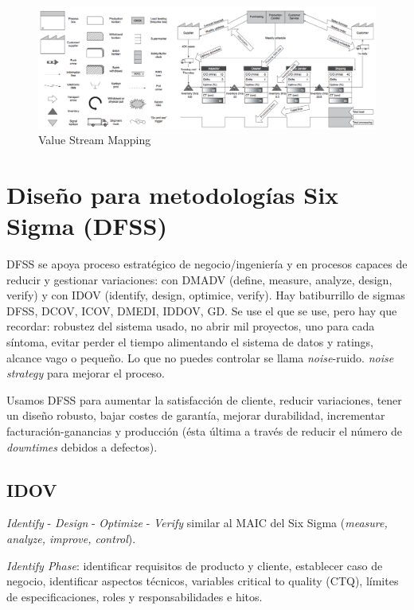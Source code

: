 \documentclass[]{article}
\begin{document}
\begin{figure}[ht!]
	\centering
	\includegraphics[width=170mm]{imagenes/ValueStreamMapping.png}
	\caption{Value Stream Mapping}
	\label{fig:ValueStreamMapping}
\end{figure}

\section{Diseño para metodologías Six Sigma (DFSS)}

DFSS se apoya proceso estratégico de negocio/ingeniería y en procesos capaces de reducir y gestionar variaciones: con DMADV (define, measure, analyze, design, verify) y con IDOV (identify, design, optimice, verify). Hay batiburrillo de sigmas DFSS, DCOV, ICOV, DMEDI, IDDOV, GD. Se use el que se use, pero hay que recordar: robustez del sistema usado, no abrir mil proyectos, uno para cada síntoma, evitar perder el tiempo alimentando el sistema de datos y ratings, alcance vago o pequeño. Lo que no puedes controlar se llama \textit{noise}-ruido. \textit{noise strategy} para mejorar el proceso.

Usamos DFSS para aumentar la satisfacción de cliente, reducir variaciones, tener un diseño robusto, bajar costes de garantía, mejorar durabilidad, incrementar facturación-ganancias y producción (ésta última a través de reducir el número de \textit{downtimes} debidos a defectos).

\subsection{IDOV} \textit{Identify} - \textit{Design} - \textit{Optimize} - \textit{Verify} similar al MAIC del Six Sigma (\textit{measure, analyze, improve, control}).

\textit{Identify Phase}: identificar requisitos de producto y cliente, establecer caso de negocio, identificar aspectos técnicos, variables critical to quality (CTQ), límites de especificaciones, roles y responsabilidades e hitos.
\end{document}
